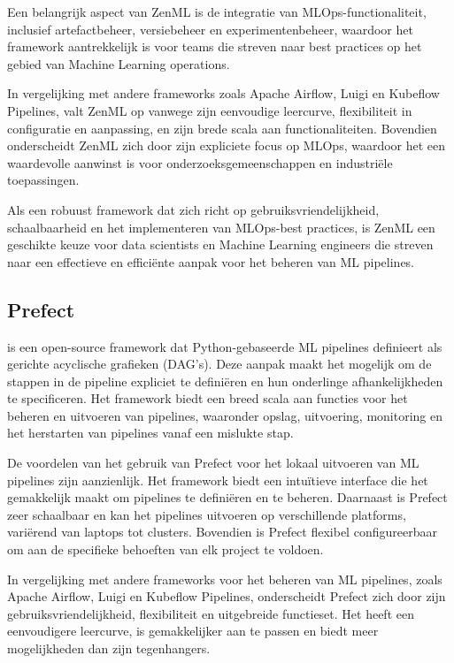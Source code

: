 Een belangrijk aspect van ZenML is de integratie van MLOps-functionaliteit, inclusief artefactbeheer, versiebeheer en experimentenbeheer, waardoor het framework aantrekkelijk is voor teams die streven naar best practices op het gebied van Machine Learning operations.

In vergelijking met andere frameworks zoals Apache Airflow, Luigi en Kubeflow Pipelines, valt ZenML op vanwege zijn eenvoudige leercurve, flexibiliteit in configuratie en aanpassing, en zijn brede scala aan functionaliteiten. Bovendien onderscheidt ZenML zich door zijn expliciete focus op MLOps, waardoor het een waardevolle aanwinst is voor onderzoeksgemeenschappen en industriële toepassingen.

Als een robuust framework dat zich richt op gebruiksvriendelijkheid, schaalbaarheid en het implementeren van MLOps-best practices, is ZenML een geschikte keuze voor data scientists en Machine Learning engineers die streven naar een effectieve en efficiënte aanpak voor het beheren van ML pipelines.


\subsection{Prefect}

\textcite{Prefect2024} is een open-source framework dat Python-gebaseerde ML pipelines definieert als gerichte acyclische grafieken (DAG's). Deze aanpak maakt het mogelijk om de stappen in de pipeline expliciet te definiëren en hun onderlinge afhankelijkheden te specificeren. Het framework biedt een breed scala aan functies voor het beheren en uitvoeren van pipelines, waaronder opslag, uitvoering, monitoring en het herstarten van pipelines vanaf een mislukte stap.

De voordelen van het gebruik van Prefect voor het lokaal uitvoeren van ML pipelines zijn aanzienlijk. Het framework biedt een intuïtieve interface die het gemakkelijk maakt om pipelines te definiëren en te beheren. Daarnaast is Prefect zeer schaalbaar en kan het pipelines uitvoeren op verschillende platforms, variërend van laptops tot clusters. Bovendien is Prefect flexibel configureerbaar om aan de specifieke behoeften van elk project te voldoen.

In vergelijking met andere frameworks voor het beheren van ML pipelines, zoals Apache Airflow, Luigi en Kubeflow Pipelines, onderscheidt Prefect zich door zijn gebruiksvriendelijkheid, flexibiliteit en uitgebreide functieset. Het heeft een eenvoudigere leercurve, is gemakkelijker aan te passen en biedt meer mogelijkheden dan zijn tegenhangers.

